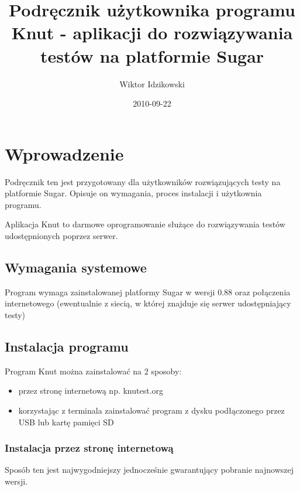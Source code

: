 \documentclass[letterpaper,10pt,polish]{sphinxmanual}
\title{Podręcznik użytkownika programu Knut - aplikacji do rozwiązywania testów na platformie Sugar}
\date{2010-09-22}
\author{Wiktor Idzikowski}
\begin{document}
\maketitle
\tableofcontents
{}\label{index::doc}



\chapter{Wprowadzenie}
\label{index:id1}\label{index:witamy-w-podreczniku-uzytkownika-programu-knut-aplikacji-do-rozwiazywania-testow-na-platformie-sugar}\label{index:wprowadzenie}
Podręcznik ten jest przygotowany dla użytkowników rozwiązujących testy na platformie Sugar. Opisuje on wymagania, proces instalacji i użytkownia programu.

Aplikacja Knut to darmowe oprogramowanie służące do rozwiązywania testów udostępnionych poprzez serwer.


\section{Wymagania systemowe}
\label{index:wymagania-systemowe}\label{index:id2}
Program wymaga zainstalowanej platformy Sugar w wersji 0.88 oraz połączenia internetowego (ewentualnie z siecią, w której znajduje się serwer udostępniający testy)


\section{Instalacja programu}
\label{index:instalacja-programu}\label{index:id3}
Program Knut można zainstalować na 2 sposoby:
\begin{itemize}
\item {} 
przez stronę internetową np. knutest.org

\item {} 
korzystając z terminala zainstalować program z dysku podłączonego przez USB lub kartę pamięci SD

\end{itemize}


\subsection{Instalacja przez stronę internetową}
\label{index:instalacja-przez-strone-internetowa}
Sposób ten jest najwygodniejszy jednocześnie gwarantujący pobranie najnowszej wersji.
\end{document}
